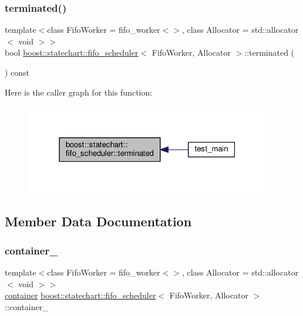 \subsubsection{\texorpdfstring{terminated()}{terminated()}}
{\footnotesize\ttfamily template$<$class Fifo\+Worker = fifo\+\_\+worker$<$$>$, class Allocator = std\+::allocator$<$ void $>$$>$ \\
bool \mbox{\hyperlink{classboost_1_1statechart_1_1fifo__scheduler}{boost\+::statechart\+::fifo\+\_\+scheduler}}$<$ Fifo\+Worker, Allocator $>$\+::terminated (\begin{DoxyParamCaption}{ }\end{DoxyParamCaption}) const\hspace{0.3cm}{\ttfamily [inline]}}

Here is the caller graph for this function\+:
\nopagebreak
\begin{figure}[H]
\begin{center}
\leavevmode
\includegraphics[width=304pt]{classboost_1_1statechart_1_1fifo__scheduler_a231ad7f0d511dcc9be86270a9ace50bd_icgraph}
\end{center}
\end{figure}


\subsection{Member Data Documentation}
\mbox{\label{classboost_1_1statechart_1_1fifo__scheduler_a87fdd84b72a6fbea81eab725050c553a}} 
\subsubsection{\texorpdfstring{container\+\_\+}{container\_}}
{\footnotesize\ttfamily template$<$class Fifo\+Worker = fifo\+\_\+worker$<$$>$, class Allocator = std\+::allocator$<$ void $>$$>$ \\
\mbox{\hyperlink{classboost_1_1statechart_1_1fifo__scheduler_a1bb1a46846b8c95208a1d2e0c364ac6e}{container}} \mbox{\hyperlink{classboost_1_1statechart_1_1fifo__scheduler}{boost\+::statechart\+::fifo\+\_\+scheduler}}$<$ Fifo\+Worker, Allocator $>$\+::container\+\_\+\hspace{0.3cm}{\ttfamily [private]}}

